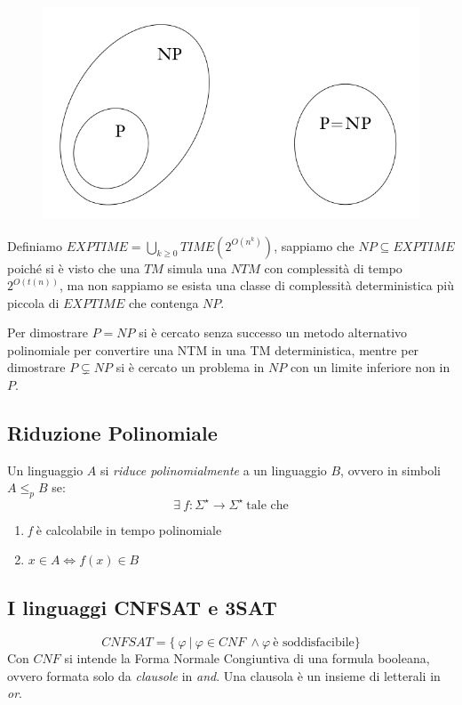 \begin{figure}[H]
    \centering
    \includegraphics[scale=0.40]{PNP}
\end{figure}

Definiamo $ EXPTIME = \displaystyle \bigcup_{k \geq 0}{TIME(2^{O(n^k)})} $, 
sappiamo che $ NP \subseteq EXPTIME$ poiché si è visto che una $TM$ simula una $NTM$ con complessità di tempo $2^{O(t(n))}$, ma non sappiamo se esista una classe di complessità deterministica più piccola di $EXPTIME$ che contenga $NP$. 

Per dimostrare $P=NP$ si è cercato senza successo un metodo alternativo polinomiale per convertire una NTM in una TM deterministica, mentre per dimostrare $P\subsetneq NP$ si è cercato un problema in $NP$ con un limite inferiore non in $P$.


\subsection{Riduzione Polinomiale}

Un linguaggio $A$ si \textit{riduce polinomialmente} a un linguaggio $B$, ovvero in simboli $A \leq_p B$ se:
\[
   \exists \ f: \Sigma^{\star} \rightarrow \Sigma^{\star} \ \text{tale che}
\]
\begin{enumerate}
    \item \textit{f} è calcolabile in tempo polinomiale 
    \item $ x \in A \iff f(x) \in B $
\end{enumerate}

\subsection{I linguaggi CNFSAT e 3SAT}

\[
    CNFSAT = \{ \ \varphi \ | \ \varphi \in CNF \ \land \varphi \ \text{è soddisfacibile} \}
\]
Con $CNF$ si intende la Forma Normale Congiuntiva di una formula booleana, ovvero formata solo da \textit{clausole} in \textit{and}. Una clausola è un insieme di letterali in \textit{or}.

